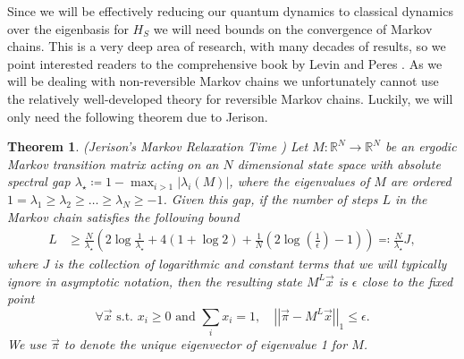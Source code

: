 \documentclass{article}
\newtheorem{theorem}{Theorem}
\newcommand{\norm}[1]{\left|\left| #1 \right|\right|}
\begin{document}
Since we will be effectively reducing our quantum dynamics to classical dynamics over the eigenbasis for $H_S$ we will need bounds on the convergence of Markov chains. This is a very deep area of research, with many decades of results, so we point interested readers to the comprehensive book by Levin and Peres \cite{levin2017markov}. As we will be dealing with non-reversible Markov chains we unfortunately cannot use the relatively well-developed theory for reversible Markov chains. Luckily, we will only need the following theorem due to Jerison.
\begin{theorem}(Jerison's Markov Relaxation Time \cite{jerison2013general}) \label{thm:markov_chain_bound}
    Let $M : \mathbb{R}^{N} \to  \mathbb{R}^{N}$ be an ergodic Markov transition matrix acting on an $N$ dimensional state space with absolute spectral gap $\lambda_{\star} \coloneqq 1 - \max_{i > 1} |\lambda_i(M)|$, where the eigenvalues of $M$ are ordered $1 = \lambda_1 \ge \lambda_2 \ge \ldots \ge \lambda_N \geq -1$. Given this gap, if the number of steps $L$ in the Markov chain satisfies the following bound
    \begin{align}
        L &\ge \frac{N}{\lambda_{\star}} \left( 2\log \frac{1}{\lambda_{\star}} + 4(1 + \log 2) +  \frac{1}{N} (2 \log \left( \frac{1}{\epsilon} \right) - 1) \right) \eqqcolon \frac{N}{\lambda_\star} J,
    \end{align}
    where $J$ is the collection of logarithmic and constant terms that we will typically ignore in asymptotic notation, then the resulting state $M^L \vec{x}$ is $\epsilon$ close to the fixed point
    \begin{equation}
        \forall \vec{x} \text{ s.t. } x_i \ge 0 \text{ and } \sum_i x_i = 1, \quad \norm{\vec{\pi} - M^L \vec{x}}_1 \le \epsilon.
    \end{equation}
    We use $\vec{\pi}$ to denote the unique eigenvector of eigenvalue 1 for $M$.
\end{theorem}
\end{document}
